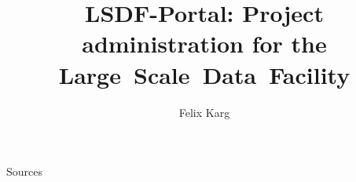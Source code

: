 \usepackage[ngerman, english]{babel}


\title{LSDF-Portal: Project administration for the Large~Scale~Data~Facility} %
\author{Felix Karg}


\graphicspath{ {./img/} {../template/} {../template_tex/} {./code/} } %

\newif\iftwocols
\twocolsfalse














\begin{frame}{Sources}
% 


\end{frame}




